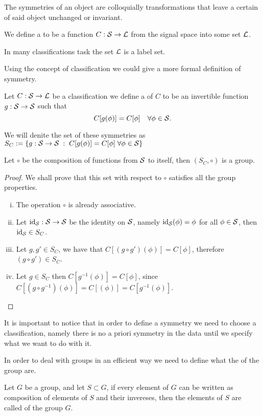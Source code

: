 \documentclass[../3.tex]{subfiles}
\begin{document}
    The symmetries of an object are colloquially transformations that leave
    a certain  of said object unchanged or invariant. 

    \begin{defn}
        We define a  to be a function $C : \mathcal{S} \to \mathcal{L}$ from the signal space into some set $\mathcal{L}$.
    \end{defn}

    In many classifications task the set $\mathcal{L}$ is a label set.

    Using the concept of classification we could give a more formal definition of symmetry.

    \begin{defn}
        Let $C : \mathcal{S} \to \mathcal{L}$ be a classification we define a  of $C$ to be an invertible function
        $g : \mathcal{S} \to \mathcal{S}$ such that 
        \[ C[g(\phi)] = C[\phi] \quad \forall \phi \in \mathcal{S}. \]
    \end{defn}

    We will denite the set of these symmetries as $S_C := \{ g : \mathcal{S} \to \mathcal{S} \; : \; C[g(\phi)] = C[\phi] \;  \forall \phi \in \mathcal{S}\}$

    \begin{prop}
        Let $\circ$ be the composition of functions from $\mathcal{S}$ to itself, then $(S_C, \circ)$ is a group.
    \end{prop} 
    \begin{proof}
        We shall prove that this set with respect to $\circ$ satisfies all the group properties.
        \begin{enumerate}[(i)]
            \item The operation $\circ$ is already associative.
            \item Let $\text{id}_{\mathcal{S}} : \mathcal{S} \to \mathcal{S}$ be the identity on $\mathcal{S}$, namely $\text{id}_{\mathcal{S}}(\phi) = \phi$ for all $\phi \in \mathcal{S}$,
                then $\text{id}_{\mathcal{S}} \in S_C$.
            \item Let $g,g' \in S_C$, we have that $C[(g\circ g')(\phi)] = C[\phi]$, therefore $(g \circ g') \in S_C$.
            \item Let $g \in S_C$ then $C[g^{-1}(\phi)] = C[\phi]$, since $C[(g \circ g^{-1})(\phi)] = C[(\phi)] = C[g^{-1}(\phi)]$. \qedhere
        \end{enumerate}
    \end{proof}

    It is important to notice that in order to define a symmetry we need to choose a classification, namely there is no a priori symmetry in the data until
    we specify what we want to do with it.

    In order to deal with groups in an efficient way we need to define what the  of the group are.

    \begin{defn}
        Let $G$ be a group, and let $S \subset G$, if every element of $G$ can be written as composition of elements of $S$ and their invereses,
        then the elements of $S$ are called  of the group $G$.
    \end{defn}
\end{document}
